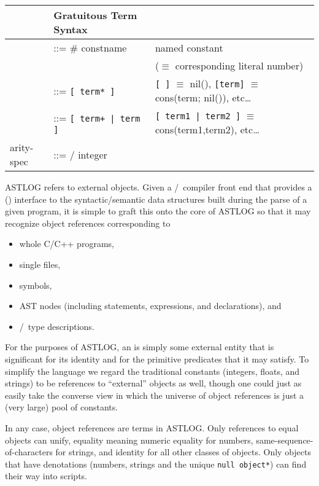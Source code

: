 \noindent
\begin{tabular}{l l l}
\hline
&Gratuitous Term Syntax&\\
\hline
&::= \# constname & named constant\\&&($\equiv$ corresponding literal number)\\
&::= \verb|[ term* ]| & \verb|[ ]| $\equiv$ nil(), \verb|[term]| $\equiv$
cons(term; nil()), etc\ldots\\
&::= \verb$[ term+ | term ]$ & \verb$[ term1 | term2 ]$ $\equiv$
cons(term1,term2), etc\ldots\\
arity-spec & ::= / integer &\\ 
\end{tabular}


ASTLOG refers to external objects. Given a \ci/\cpp\ compiler front end that
provides a (\cpp) interface to the syntactic/semantic data structures built
during the parse of a given program, it is simple to graft this onto the core of
ASTLOG so that it may recognize object references corresponding to
\begin{itemize}[nosep]
  \item whole C/C++ programs,
  \item single files,
  \item symbols,
  \item AST nodes (including statements, expressions, and declarations), and
  \item \ci/\cpp\ type descriptions.
\end{itemize}

For the purposes of ASTLOG, an  is simply some external entity that
is significant for its identity and for the primitive predicates that it may
satisfy. To simplify the language we regard the traditional
constants (integers, floats, and strings) to be references to ``external''
objects as well, though one could just as easily take the converse view in which
the universe of object references is just a (very large) pool of
constants.

In any case, object references are terms in ASTLOG. Only references to equal
objects can unify, equality meaning numeric equality for numbers,
same-sequence-of-characters for strings, and identity for all other classes of
objects. Only objects that have denotations (numbers, strings and the unique
\verb|null object*|) can find their way into scripts.


